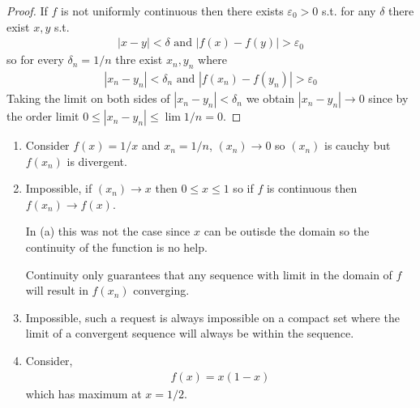 \begin{proof}
    If $f$ is not uniformly continuous then there exists $\varepsilon_0>0$
    s.t. for any $\delta$ there exist $x,y$ s.t. 
    \begin{align*}
        |x-y|<\delta \text{ and } |f(x)-f(y)|>\varepsilon_0
    \end{align*}
    so for every $\delta_n=1/n$ thre exist $x_n, y_n$ where 
    \begin{align*}
        |x_n-y_n|<\delta_n \text{ and } |f(x_n)-f(y_n)|>\varepsilon_0
    \end{align*}
    Taking the limit on both sides of $|x_n-y_n|<\delta_n$ we obtain
    $|x_n-y_n| \rightarrow 0$ since by the order limit \Thm $0 \leq 
    |x_n-y_n|\leq \lim 1/n = 0$.
\end{proof}

\begin{enumerate}[label=(\alph*)]
    \item 
    Consider $f(x)=1/x$ and $x_n=1/n$, $(x_n) \rightarrow 0$ so $(x_n)$
    is cauchy but $f(x_n)$ is divergent.

    \item
    Impossible, if $(x_n)\rightarrow x$ then $0\leq x \leq 1$ so if $f$
    is continuous then $f(x_n)\rightarrow f(x)$.

    In (a) this was not the case since $x$ can be outisde 
    the domain so the continuity of the function is no help.

    Continuity only guarantees that any sequence with limit in 
    the domain of $f$ will result in $f(x_n)$ converging.

    \item
    Impossible, such a request is always impossible on a compact set 
    where the limit of a convergent sequence will always be within the 
    sequence.

    \item
    Consider,
    \begin{align*}
        f(x) = x(1-x)
    \end{align*}
    which has maximum at $x=1/2$.
\end{enumerate}

